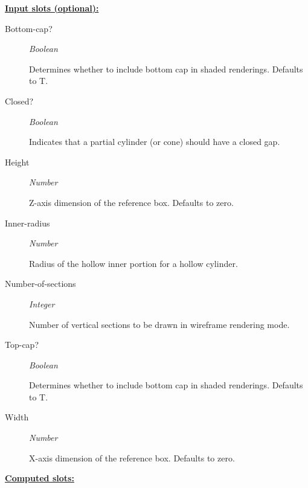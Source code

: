 \documentclass [11pt]{book}
\begin{document}
\begin{itemize}
\textbf{
\underline{Input slots (optional):}}

\begin{description}

\item [Bottom-cap?]
\emph{Boolean}

 Determines whether to include bottom cap in shaded renderings. Defaults to T.




\item [Closed?]
\emph{Boolean}

 Indicates that a partial cylinder (or cone) should have a closed gap.




\item [Height]
\emph{Number}

 Z-axis dimension of the reference box. Defaults to zero.




\item [Inner-radius]
\emph{Number}

 Radius of the hollow inner portion for a hollow cylinder.




\item [Number-of-sections]
\emph{Integer}

 Number of vertical sections to be drawn in wireframe rendering mode.




\item [Top-cap?]
\emph{Boolean}

 Determines whether to include bottom cap in shaded renderings. Defaults to T.




\item [Width]
\emph{Number}

 X-axis dimension of the reference box. Defaults to zero.




\end{description}






\textbf{
\underline{Computed slots:}}

\begin{description}


\end{description}
\end{itemize}
\end{document}
